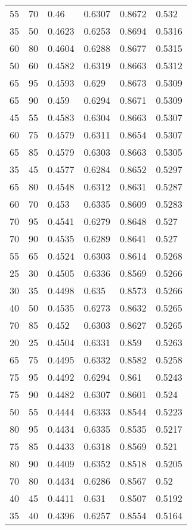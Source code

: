 \begin{center}
\begin{longtable}{|l|l|l|l|l|l|}
55 & 70 & 0.46   & 0.6307 & 0.8672 & 0.532  \\
35 & 50 & 0.4623 & 0.6253 & 0.8694 & 0.5316 \\
60 & 80 & 0.4604 & 0.6288 & 0.8677 & 0.5315 \\
50 & 60 & 0.4582 & 0.6319 & 0.8663 & 0.5312 \\
65 & 95 & 0.4593 & 0.629  & 0.8673 & 0.5309 \\
65 & 90 & 0.459  & 0.6294 & 0.8671 & 0.5309 \\
45 & 55 & 0.4583 & 0.6304 & 0.8663 & 0.5307 \\
60 & 75 & 0.4579 & 0.6311 & 0.8654 & 0.5307 \\
65 & 85 & 0.4579 & 0.6303 & 0.8663 & 0.5305 \\
35 & 45 & 0.4577 & 0.6284 & 0.8652 & 0.5297 \\
65 & 80 & 0.4548 & 0.6312 & 0.8631 & 0.5287 \\
60 & 70 & 0.453  & 0.6335 & 0.8609 & 0.5283 \\
70 & 95 & 0.4541 & 0.6279 & 0.8648 & 0.527  \\
70 & 90 & 0.4535 & 0.6289 & 0.8641 & 0.527  \\
55 & 65 & 0.4524 & 0.6303 & 0.8614 & 0.5268 \\
25 & 30 & 0.4505 & 0.6336 & 0.8569 & 0.5266 \\
30 & 35 & 0.4498 & 0.635  & 0.8573 & 0.5266 \\
40 & 50 & 0.4535 & 0.6273 & 0.8632 & 0.5265 \\
70 & 85 & 0.452  & 0.6303 & 0.8627 & 0.5265 \\
20 & 25 & 0.4504 & 0.6331 & 0.859  & 0.5263 \\
65 & 75 & 0.4495 & 0.6332 & 0.8582 & 0.5258 \\
75 & 95 & 0.4492 & 0.6294 & 0.861  & 0.5243 \\
75 & 90 & 0.4482 & 0.6307 & 0.8601 & 0.524  \\
50 & 55 & 0.4444 & 0.6333 & 0.8544 & 0.5223 \\
80 & 95 & 0.4434 & 0.6335 & 0.8535 & 0.5217 \\
75 & 85 & 0.4433 & 0.6318 & 0.8569 & 0.521  \\
80 & 90 & 0.4409 & 0.6352 & 0.8518 & 0.5205 \\
70 & 80 & 0.4434 & 0.6286 & 0.8567 & 0.52   \\
40 & 45 & 0.4411 & 0.631  & 0.8507 & 0.5192 \\
35 & 40 & 0.4396 & 0.6257 & 0.8554 & 0.5164 \\

\end{longtable}
\end{center}
